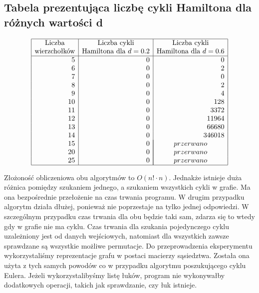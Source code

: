 \documentclass[polish,polish,a4paper]{article}
\begin{document}
\begin{spacing}{1.25}
\begin{spacing}{1.3}
	{\centering \subsection*{Tabela prezentująca liczbę cykli Hamiltona dla różnych wartości d}}
	\begin{equation*}
	\begin{array}{|r|r|r|}
	\hline
	\multicolumn{1}{|c|}{$Liczba$}&
	\multicolumn{1}{c|}{$Liczba cykli$}&
	\multicolumn{1}{c|}{$Liczba cykli$}\\
	\multicolumn{1}{|c|}{$wierzchołków$}&
	\multicolumn{1}{c|}{$Hamiltona dla $ d=0.2}&
	\multicolumn{1}{c|}{$Hamiltona dla $ d=0.6}\\
	\hline
	5&0&0\\
	6&0&2\\
	7&0&0\\
	8&0&2\\
	9&0&4\\
	10&0&128\\
	11&0&3372\\
	12&0&11964\\
	13&0&66680\\
	14&0&346018\\
	15&0&\multicolumn{1}{|c|}{przerwano}\\
	20&0&\multicolumn{1}{|c|}{przerwano}\\
	25&0&\multicolumn{1}{|c|}{przerwano}\\
	
	\hline
	\end{array}
	\end{equation*}
\end{spacing}
Złożoność obliczeniowa obu algorytmów to $ O(n! \cdot n) $.
Jednakże istnieje duża różnica pomiędzy szukaniem jednego, a szukaniem wszystkich cykli w grafie. Ma ona bezpośrednie przełożenie na czas trwania programu. W drugim przypadku algorytm działa dłużej, ponieważ nie poprzestaje na tylko jednej odpowiedzi. W szczególnym przypadku czas trwania dla obu będzie taki sam, zdarza się to wtedy gdy w grafie nie ma cyklu. Czas trwania dla szukania pojedynczego cyklu uzależniony jest od danych wejściowych, natomiast dla wszystkich zawsze sprawdzane są wszystkie możliwe permutacje.
Do przeprowadzenia eksperymentu wykorzystaliśmy reprezentacje grafu w postaci macierzy sąsiedztwa. Została ona użyta z tych samych powodów co w przypadku algorytmu poszukującego cyklu Eulera. Jeżeli wykorzystalibyśmy listę łuków, program nie wykonywałby dodatkowych operacji, takich jak sprawdzanie, czy łuk istnieje.


\end{spacing}
\end{document}
